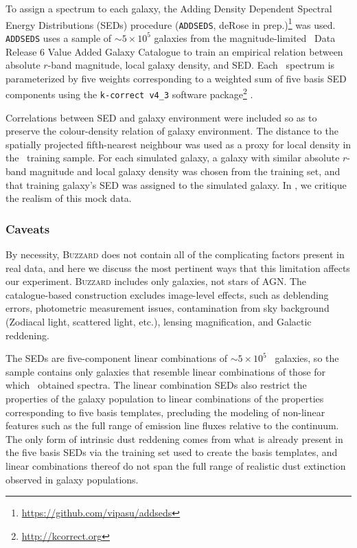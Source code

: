 To assign a spectrum to each galaxy, the Adding Density Dependent Spectral Energy Distributions (SEDs) procedure (\texttt{ADDSEDS}, deRose in prep.)\footnote{\url{https://github.com/vipasu/addseds}} was used.
\texttt{ADDSEDS} uses a sample of $\sim 5\times 10^{5}$ galaxies from the magnitude-limited \sdss\ Data Release 6 Value Added Galaxy Catalogue \citep{Blanton:05} to train an empirical relation between absolute $r$-band magnitude, local galaxy density, and SED.
Each \sdss\ spectrum is parameterized by five weights corresponding to a weighted sum of five basis SED components using the \texttt{k-correct v4\_3} software package\footnote{\url{http://kcorrect.org}} \citep{Blanton:07}.

Correlations between SED and galaxy environment were included so as to preserve the colour-density relation of galaxy environment.
The distance to the spatially projected fifth-nearest neighbour was used as a proxy for local density in the \sdss\ training sample.
For each simulated galaxy, a galaxy with similar absolute $r$-band magnitude and local galaxy density was chosen from the training set, and that training galaxy's SED was assigned to the simulated galaxy.
In , we critique the realism of this mock data.

\subsubsection{Caveats}

By necessity, \textsc{Buzzard} does not contain all of the complicating factors present in real data, and here we discuss the most pertinent ways that this limitation affects our experiment.
\textsc{Buzzard} includes only galaxies, not stars of AGN.
The catalogue-based construction excludes image-level effects, such as deblending errors, photometric measurement issues, contamination from sky background (Zodiacal light, scattered light, etc.), lensing magnification, and Galactic reddening.

The SEDs are five-component linear combinations of $\sim 5 \times 10^{5}$ \sdss\ galaxies, so the sample contains only galaxies that resemble linear combinations of those for which \sdss\ obtained spectra.
The linear combination SEDs also restrict the properties of the galaxy population to linear combinations of the properties corresponding to five basis templates, precluding the modeling of non-linear features such as the full range of emission line fluxes relative to the continuum.
The only form of intrinsic dust reddening comes from what is already present in the five basis SEDs via the training set used to create the basis templates, and linear combinations thereof do not span the full range of realistic dust extinction observed in galaxy populations.

